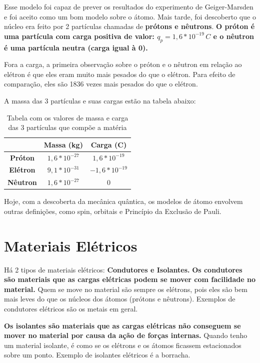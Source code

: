 \documentclass[12pt]{extarticle}
\newcommand{\<}{\langle}
\renewcommand{\>}{\rangle}
\theoremstyle{definition}
\begin{document}
Esse modelo foi capaz de prever os resultados do experimento de Geiger-Marsden e foi aceito como um bom modelo sobre o átomo. Mais tarde, foi descoberto que o núcleo era feito por 2 partículas chamadas de \textbf{prótons e nêutrons}.
\textbf{O próton é uma partícula com carga positiva de valor: $q_p = 1,6*10^{-19}\,C$ e o nêutron é uma partícula neutra (carga igual à 0).}

Fora a carga, a primeira observação sobre o próton e o nêutron em relação ao elétron é que eles eram muito mais pesados do que o elétron. Para efeito de comparação, eles são 1836 vezes mais pesados do que o elétron.

A massa das 3 partículas e suas cargas estão na tabela abaixo:
\begin{table}[H]
    \centering
    \begin{tabular}{|c|c|c|}
         \hline
         &\textbf{Massa (kg)} & \textbf{Carga (C)}\\
         \hline
         \textbf{Próton}& $1,6*10^{-27}$ & $1,6*10^{-19}$\\
         \hline
         \textbf{Elétron}& $9,1*10^{-31}$ & $-1,6*10^{-19}$ \\
         \hline
         \textbf{Nêutron}& $1,6*10^{-27}$ & $0$ \\
         \hline
    \end{tabular}
    \caption{Tabela com os valores de massa e carga das 3 partículas que compõe a matéria}
    \label{tab:table_1}
\end{table}

Hoje, com a descoberta da mecânica quântica, os modelos de átomo envolvem outras definições, como spin, orbitais e Princípio da Exclusão de Pauli.

\section{Materiais Elétricos}
Há 2 tipos de materiais elétricos: \textbf{Condutores e Isolantes.}
\textbf{Os condutores são materiais que as cargas elétricas podem se mover com facilidade no material.} Quem se move no material são sempre os elétrons, pois eles são bem mais leves do que os núcleos dos átomos (prótons e nêutrons). Exemplos de condutores elétricos são os metais em geral.

\textbf{Os isolantes são materiais que as cargas elétricas não conseguem se mover no material por causa da ação de forças internas.} Quando tenho um material isolante, é como se os elétrons e os átomos ficassem estacionados sobre um ponto. Exemplo de isolantes elétricos é a borracha.
\end{document}
